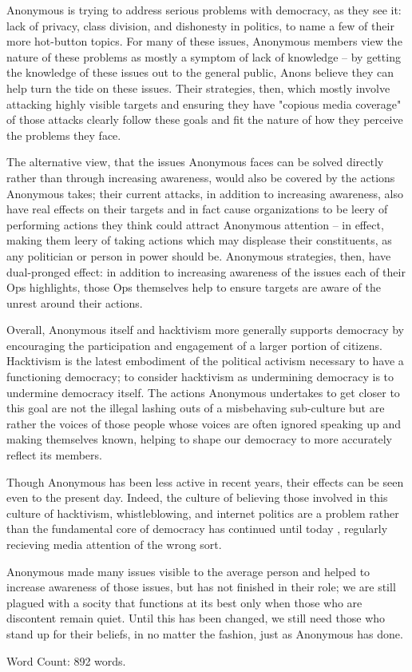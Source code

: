 \documentclass[12pt]{article}
\begin{document}
Anonymous is trying to address serious problems with democracy, as they see it: lack of privacy, class division, and dishonesty in politics, to name a few of their more hot-button topics. For many of these issues, Anonymous members view the nature of these problems as mostly a symptom of lack of knowledge -- by getting the knowledge of these issues out to the general public, Anons believe they can help turn the tide on these issues. Their strategies, then, which mostly involve attacking highly visible targets and ensuring they have "copious media coverage" \cite{coleman} of those attacks clearly follow these goals and fit the nature of how they perceive the problems they face.

The alternative view, that the issues Anonymous faces can be solved directly rather than through increasing awareness, would also be covered by the actions Anonymous takes; their current attacks, in addition to increasing awareness, also have real effects on their targets and in fact cause organizations to be leery of performing actions they think could attract Anonymous attention -- in effect, making them leery of taking actions which may displease their constituents, as any politician or person in power should be. Anonymous strategies, then, have dual-pronged effect: in addition to increasing awareness of the issues each of their Ops highlights, those Ops themselves help to ensure targets are aware of the unrest around their actions.

Overall, Anonymous itself and hacktivism more generally supports democracy by encouraging the participation and engagement of a larger portion of citizens. Hacktivism is the latest embodiment of the political activism necessary to have a functioning democracy; to consider hacktivism as undermining democracy is to undermine democracy itself. The actions Anonymous undertakes to get closer to this goal are not the illegal lashing outs of a misbehaving sub-culture but are rather the voices of those people whose voices are often ignored speaking up and making themselves known, helping to shape our democracy to more accurately reflect its members.

Though Anonymous has been less active in recent years, their effects can be seen even to the present day. Indeed, the culture of believing those involved in this culture of hacktivism, whistleblowing, and internet politics are a problem rather than the fundamental core of democracy has continued until today \cite{whistleblower}, regularly recieving media attention of the wrong sort.

Anonymous made many issues visible to the average person and helped to increase awareness of those issues, but has not finished in their role; we are still plagued with a socity that functions at its best only when those who are discontent remain quiet. Until this has been changed, we still need those who stand up for their beliefs, in no matter the fashion, just as Anonymous has done.

Word Count: 892 words.

\newpage

\end{document}
